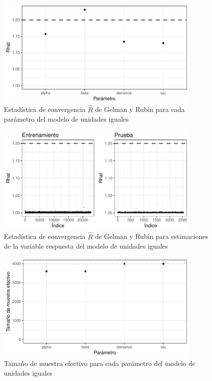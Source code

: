 \begin{figure}[H]
    \centering
    \includegraphics[width=0.9\textwidth]{images/comp_pooling_r_statistic_params.pdf}
    \caption{Estadística de convergencia $\hat{R}$ de Gelman y Rubin para cada parámetro del modelo de unidades iguales}
    \label{fig:comp_pooling_r_statistic_params}
\end{figure}

\begin{figure}[H]
    \centering
    \includegraphics[width=0.9\textwidth]{images/comp_pooling_r_statistic_yf.pdf}
    \caption{Estadística de convergencia $\hat{R}$ de Gelman y Rubin para estimaciones de la variable respuesta del modelo de unidades iguales}
    \label{fig:comp_pooling_r_statistic_yf}
\end{figure}

\begin{figure}[H]
    \centering
    \includegraphics[width=0.9\textwidth]{images/comp_pooling_n_eff_params.pdf}
    \caption{Tamaño de muestra efectivo para cada parámetro del modelo de unidades iguales}
    \label{fig:comp_pooling_n_eff_params}
\end{figure}

